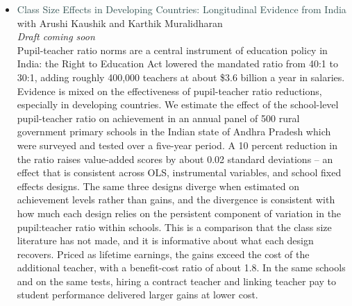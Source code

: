 \documentclass[letter,10pt]{article}
\begin{document}
\begin{itemize}
    \item[] \textcolor{darkslategray}{Class Size Effects in Developing Countries: Longitudinal Evidence from India} {\small{with Arushi Kaushik and Karthik Muralidharan}} \\
    {\small{\textit{Draft coming soon}}}\\
    Pupil-teacher ratio norms are a central instrument of education policy in India: the Right to Education Act lowered the mandated ratio from 40:1 to 30:1, adding roughly 400,000 teachers at about \$3.6 billion a year in salaries. Evidence is mixed on the effectiveness of pupil-teacher ratio reductions, especially in developing countries. We estimate the effect of the school-level pupil-teacher ratio on achievement in an annual panel of 500 rural government primary schools in the Indian state of Andhra Pradesh which were surveyed and tested over a five-year period. A 10 percent reduction in the ratio raises value-added scores by about 0.02 standard deviations -- an effect that is consistent across OLS, instrumental variables, and school fixed effects designs. The same three designs diverge when estimated on achievement levels rather than gains, and the divergence is consistent with how much each design relies on the persistent component of variation in the pupil:teacher ratio within schools. This is a comparison that the class size literature has not made, and it is informative about what each design recovers. Priced as lifetime earnings, the gains exceed the cost of the additional teacher, with a benefit-cost ratio of about 1.8. In the same schools and on the same tests, hiring a contract teacher and linking teacher pay to student performance delivered larger gains at lower cost.
\end{itemize}
\end{document}
